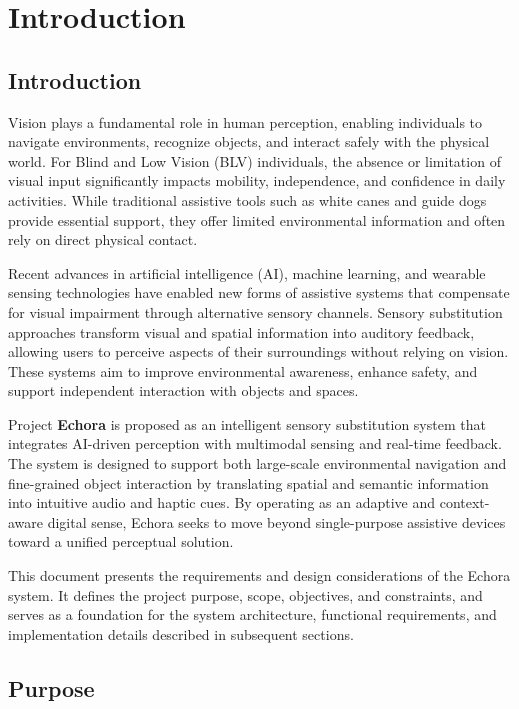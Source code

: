 \chapter{Introduction}
\label{ch:intro}

\section{Introduction}

Vision plays a fundamental role in human perception, enabling individuals to navigate environments, recognize objects, and interact safely with the physical world. For Blind and Low Vision (BLV) individuals, the absence or limitation of visual input significantly impacts mobility, independence, and confidence in daily activities. While traditional assistive tools such as white canes and guide dogs provide essential support, they offer limited environmental information and often rely on direct physical contact.

Recent advances in artificial intelligence (AI), machine learning, and wearable sensing technologies have enabled new forms of assistive systems that compensate for visual impairment through alternative sensory channels. Sensory substitution approaches transform visual and spatial information into auditory feedback, allowing users to perceive aspects of their surroundings without relying on vision. These systems aim to improve environmental awareness, enhance safety, and support independent interaction with objects and spaces.

Project \textbf{Echora} is proposed as an intelligent sensory substitution system that integrates AI-driven perception with multimodal sensing and real-time feedback. The system is designed to support both large-scale environmental navigation and fine-grained object interaction by translating spatial and semantic information into intuitive audio and haptic cues. By operating as an adaptive and context-aware digital sense, Echora seeks to move beyond single-purpose assistive devices toward a unified perceptual solution.

This document presents the requirements and design considerations of the Echora system. It defines the project purpose, scope, objectives, and constraints, and serves as a foundation for the system architecture, functional requirements, and implementation details described in subsequent sections.

\section{Purpose}

